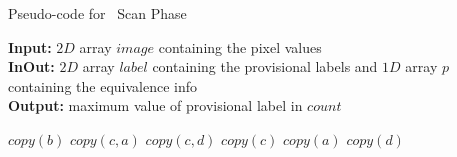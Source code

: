 \clearpage
\begin{algorithm}[H]
\small
{
	\caption{Pseudo-code for \nremsp\ Scan Phase}
	\label{alg:RemSP-I}
	\textbf{Input:} $2D$ array $image$ containing the pixel values \\
	\textbf{InOut:} $2D$ array $label$ containing the provisional labels and $1D$ array $p$ containing the equivalence info\\
	\textbf{Output:} maximum value of provisional label in $count$
	\begin{algorithmic}[1]
						\State $copy(b)$
					\Else
								\State $copy(c,a)$
							\Else
									\State $copy(c,d)$
								\Else
									\State $copy(c)$
								\EndIf
							\EndIf
						\Else
								\State $copy(a)$
							\Else
									\State $copy(d)$
								\Else
								\EndIf
							\EndIf
						\EndIf
					\EndIf
				\EndIf
			\EndFor
		\EndFor
		\State {}
	\EndFunction
	\end{algorithmic}
}	
\end{algorithm}

